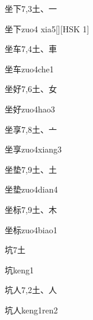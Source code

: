 \begin{entry}{坐下}{7,3}{⼟、⼀}
  \begin{phonetics}{坐下}{zuo4 xia5}[][HSK 1]
  \end{phonetics}
\end{entry}

\begin{entry}{坐车}{7,4}{⼟、⾞}
  \begin{phonetics}{坐车}{zuo4che1}
  \end{phonetics}
\end{entry}

\begin{entry}{坐好}{7,6}{⼟、⼥}
  \begin{phonetics}{坐好}{zuo4hao3}
  \end{phonetics}
\end{entry}

\begin{entry}{坐享}{7,8}{⼟、⼇}
  \begin{phonetics}{坐享}{zuo4xiang3}
  \end{phonetics}
\end{entry}

\begin{entry}{坐垫}{7,9}{⼟、⼟}
  \begin{phonetics}{坐垫}{zuo4dian4}
  \end{phonetics}
\end{entry}

\begin{entry}{坐标}{7,9}{⼟、⽊}
  \begin{phonetics}{坐标}{zuo4biao1}
  \end{phonetics}
\end{entry}

\begin{entry}{坑}{7}{⼟}
  \begin{phonetics}{坑}{keng1}
  \end{phonetics}
\end{entry}

\begin{entry}{坑人}{7,2}{⼟、⼈}
  \begin{phonetics}{坑人}{keng1ren2}
  \end{phonetics}
\end{entry}

